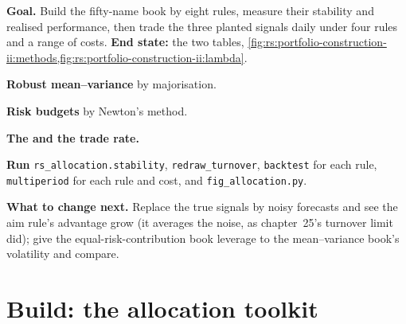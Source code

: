 \begin{tutorial}
\textbf{Goal.} Build the fifty-name book by eight rules, measure their stability and realised performance, then trade the three planted signals daily under
four rules and a range of costs. \textbf{End state:} the two tables, \cref{fig:rs:portfolio-construction-ii:methods,fig:rs:portfolio-construction-ii:lambda}.
\begin{tutsteps}
\item \textbf{Robust mean--variance} by majorisation.
\label{lst:rs:portfolio-construction-ii:robust}
\item \textbf{Risk budgets} by Newton's method.
\label{lst:rs:portfolio-construction-ii:budget}
\item \textbf{The  and the trade rate.}
\label{lst:rs:portfolio-construction-ii:gp}
\item \textbf{Run} \texttt{rs\_allocation.stability}, \texttt{redraw\_turnover}, \texttt{backtest} for each rule, \texttt{multiperiod} for each rule and cost, and
\texttt{fig\_allocation.py}.
\end{tutsteps}
\textbf{What to change next.} Replace the true signals by noisy forecasts and see the aim rule's advantage grow (it averages the noise, as chapter~25's turnover limit
did); give the equal-risk-contribution book leverage to the mean--variance book's volatility and compare.
\end{tutorial}

\section{Build: the allocation toolkit}\label{bld:rs:portfolio-construction-ii:allocation}

